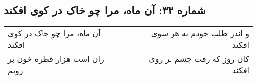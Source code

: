 \begin{center}
\section*{شماره ۳۳: آن ماه، مرا چو خاک در کوی افکند}
\label{sec:033}
\begin{longtable}{l p{0.5cm} r}
آن ماه، مرا چو خاک در کوی افکند
&&
و اندر طلب خودم به هر سوی افکند
\\
زان است هزار قطره خون بر رویم
&&
کان روز که رفت چشم بر روی افکند
\\
\end{longtable}
\end{center}
